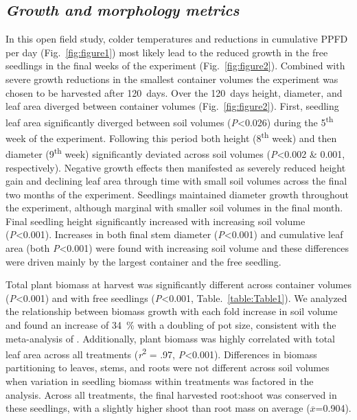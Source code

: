 \documentclass[a4paper]{article}\usepackage[]{graphicx}\usepackage[]{color}
\begin{document}
\subsection*{\textit{Growth and morphology metrics}}
In this open field study, colder temperatures and reductions in cumulative PPFD per day (Fig.~\ref{fig:figure1}) most likely lead to the reduced growth in the free seedlings in the final weeks of the experiment (Fig.~\ref{fig:figure2}).  Combined with severe growth reductions in the smallest container volumes the experiment was chosen to be harvested after 120~days. Over the 120~days height, diameter, and leaf area diverged between container volumes (Fig.~\ref{fig:figure2}).  First, seedling leaf area significantly diverged between soil volumes (\textit{P}\textless0.026) during the 5\textsuperscript{th} week of the experiment. Following this period both height (8\textsuperscript{th} week) and then diameter (9\textsuperscript{th} week) significantly deviated across soil volumes (\textit{P}\textless0.002 \& 0.001, respectively).  Negative growth effects then manifested as severely reduced height gain and declining leaf area through time with small soil volumes across the final two months of the experiment. Seedlings maintained diameter growth throughout the experiment, although marginal with smaller soil volumes in the final month. Final seedling height significantly increased with increasing soil volume (\textit{P}\textless0.001).  Increases in both final stem diameter (\textit{P}\textless0.001) and cumulative leaf area (both \textit{P}\textless0.001) were found with increasing soil volume and these differences were driven mainly by the largest container and the free seedling.

Total plant biomass at harvest was significantly different across container volumes (\textit{P}\textless0.001) and with free seedlings (\textit{P}\textless0.001, Table.~\ref{table:Table1}). We analyzed the relationship between biomass growth with each fold increase in soil volume and found an increase of 34~\% with a doubling of pot size, consistent with the meta-analysis of \citet{poorter2012pot}. Additionally, plant biomass was highly correlated with total leaf area across all treatments (\textit{r}\textsuperscript{2} = .97, \textit{P}\textless0.001). Differences in biomass partitioning to leaves, stems, and roots were not different across soil volumes when variation in seedling biomass within treatments was factored in the analysis. Across all treatments, the final harvested root:shoot was conserved in these seedlings, with a slightly higher shoot than root mass on average ($\overline{x}$=0.904).
\end{document}
